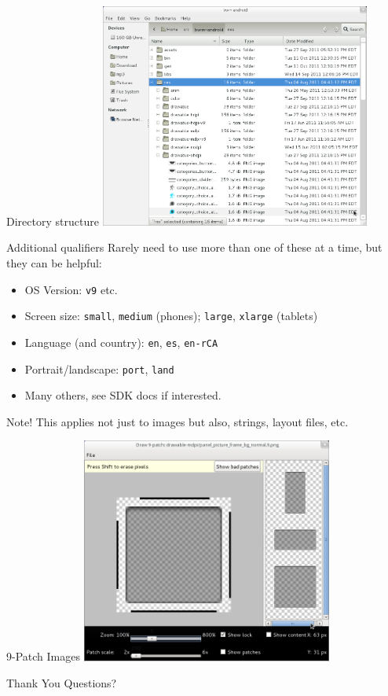 \documentclass{beamer}
\begin{document}
\begin{frame}{Directory structure}
\includegraphics[width=3.5in]{nautilus.png}
\end{frame}

\begin{frame}{Additional qualifiers}
Rarely need to use more than one of these at a time, but they can be helpful:
\begin{itemize}
\item OS Version: \texttt{v9} etc.
\item Screen size: \texttt{small}, \texttt{medium} (phones);
  \texttt{large}, \texttt{xlarge} (tablets)
\item Language (and country): \texttt{en}, \texttt{es},
  \texttt{en-rCA}
\item Portrait/landscape: \texttt{port}, \texttt{land}
\item Many others, see SDK docs if interested.
\end{itemize}
Note! This applies not just to images but also, strings, layout files, etc.
\end{frame}

\begin{frame}{9-Patch Images}
\includegraphics[width=3.25in]{draw9patch.png}
\end{frame}

\begin{frame}{Thank You}
Questions?
\end{frame}
\end{document}
